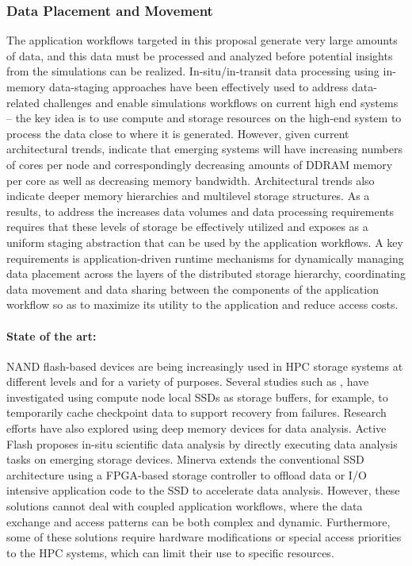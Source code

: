 \subsubsection{Data Placement and Movement}

The application workflows targeted in this proposal generate very large amounts of data, and this data must be processed and analyzed before potential insights from the simulations can be realized. In-situ/in-transit data processing using in-memory data-staging approaches have been effectively used to address data-related challenges and enable simulations workflows on current high end systems -- the key idea is to use compute and storage resources on the high-end system to process the data close to where it is generated. However, given current architectural trends, indicate that emerging systems will have increasing numbers of cores per node and correspondingly decreasing amounts of DDRAM memory per core as well as decreasing memory bandwidth. Architectural trends also indicate deeper memory hierarchies and multilevel storage structures. As a results, to address the increases data volumes and data processing requirements requires that these levels of storage be effectively utilized and exposes as a uniform staging abstraction that can be used by the application workflows.  A key requirements is application-driven runtime mechanisms for dynamically managing data placement across the layers of the distributed storage hierarchy, coordinating data movement and data sharing between the components of the application workflow so as to maximize its utility to the application and reduce access costs. 

\paragraph{State of the art:} NAND flash-based devices are being increasingly used in HPC storage systems at different levels and for a variety of purposes. Several studies such as \cite{multitier}, \cite{sc10li} have investigated using compute node local SSDs as storage buffers, for example, to temporarily cache checkpoint data to support recovery from failures. Research efforts have also explored using deep memory devices for data analysis. Active Flash \cite{activeflash} proposes in-situ scientific data analysis by directly executing data analysis tasks on emerging storage devices. Minerva \cite{minerva} extends the conventional SSD architecture using a FPGA-based storage controller to offload data or I/O intensive application code to the SSD to accelerate data analysis. However, these solutions cannot deal with coupled application workflows, where the data exchange and access patterns can be both complex and dynamic. Furthermore, some of these solutions require hardware modifications or special access priorities to the HPC systems, which can limit their use to specific resources.


